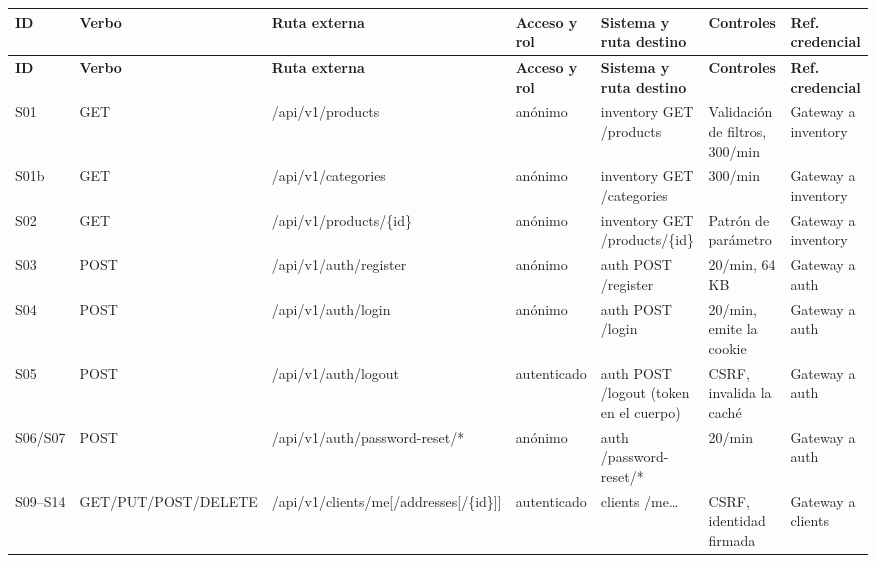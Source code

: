 \documentclass[10pt,letterpaper]{article}
\begin{document}
{\scriptsize
\begin{longtable}{|P{\tabcolsep\relax}|P{\tabcolsep\relax}|P{\tabcolsep\relax}|P{\tabcolsep\relax}|P{\tabcolsep\relax}|P{\tabcolsep\relax}|P{\tabcolsep\relax}|}
\hline
\textbf{ID} & \textbf{Verbo} & \textbf{Ruta externa} & \textbf{Acceso y rol} & \textbf{Sistema y ruta destino} & \textbf{Controles} & \textbf{Ref. credencial} \\ \hline
\endfirsthead
\hline
\textbf{ID} & \textbf{Verbo} & \textbf{Ruta externa} & \textbf{Acceso y rol} & \textbf{Sistema y ruta destino} & \textbf{Controles} & \textbf{Ref. credencial} \\ \hline
\endhead
S01 & GET & /\allowbreak{}api/\allowbreak{}v1/\allowbreak{}products & anónimo & inventory GET /\allowbreak{}products & Validación de filtros, 300/\allowbreak{}min & Gateway a inventory \\ \hline
S01b & GET & /\allowbreak{}api/\allowbreak{}v1/\allowbreak{}categories & anónimo & inventory GET /\allowbreak{}categories & 300/\allowbreak{}min & Gateway a inventory \\ \hline
S02 & GET & /\allowbreak{}api/\allowbreak{}v1/\allowbreak{}products/\allowbreak{}\{id\} & anónimo & inventory GET /\allowbreak{}products/\allowbreak{}\{id\} & Patrón de parámetro & Gateway a inventory \\ \hline
S03 & POST & /\allowbreak{}api/\allowbreak{}v1/\allowbreak{}auth/\allowbreak{}register & anónimo & auth POST /\allowbreak{}register & 20/\allowbreak{}min, 64 KB & Gateway a auth \\ \hline
S04 & POST & /\allowbreak{}api/\allowbreak{}v1/\allowbreak{}auth/\allowbreak{}login & anónimo & auth POST /\allowbreak{}login & 20/\allowbreak{}min, emite la cookie & Gateway a auth \\ \hline
S05 & POST & /\allowbreak{}api/\allowbreak{}v1/\allowbreak{}auth/\allowbreak{}logout & autenticado & auth POST /\allowbreak{}logout (token en el cuerpo) & CSRF, invalida la caché & Gateway a auth \\ \hline
S06/\allowbreak{}S07 & POST & /\allowbreak{}api/\allowbreak{}v1/\allowbreak{}auth/\allowbreak{}password-reset/\allowbreak{}* & anónimo & auth /\allowbreak{}password-reset/\allowbreak{}* & 20/\allowbreak{}min & Gateway a auth \\ \hline
S09–S14 & GET/\allowbreak{}PUT/\allowbreak{}POST/\allowbreak{}DELETE & /\allowbreak{}api/\allowbreak{}v1/\allowbreak{}clients/\allowbreak{}me[/\allowbreak{}addresses[/\allowbreak{}\{id\}]] & autenticado & clients /\allowbreak{}me… & CSRF, identidad firmada & Gateway a clients \\ \hline

\end{longtable}}
\end{document}
